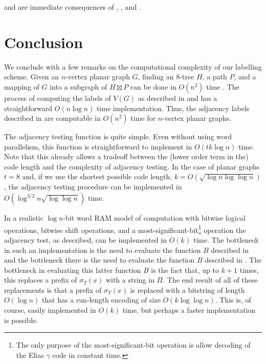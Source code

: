 \documentclass[kpfonts]{patmorin}
\begin{document}
 and  are immediate consequences of , , and .

\section{Conclusion}

We conclude with a few remarks on the computational complexity of our labelling scheme.  Given an $n$-vertex planar graph $G$, finding an 8-tree $H$, a path $P$, and a mapping of $G$ into a subgraph of $H\boxtimes P$ can be done in $O(n^2)$ time \cite{dujmovic.joret.ea:planar}.  The process of computing the labels of $V(G)$ as described in  and  has a straightforward $O(n\log n)$ time implementation.  Thus, the adjacency labels described in  are computable in $O(n^2)$ time for $n$-vertex planar graphs.

The adjacency testing function is quite simple. Even without using word parallelism, this function is straightforward to implement in $O(tk\log n)$ time.  Note that this already allows a tradeoff between the (lower order term in the) code length and the complexity of adjacency testing.
In the case of planar graphs $t=8$ and, if we use the shortest possible code length, $k=O(\sqrt{\log n\log\log n})$, the adjacency testing procedure can be implemented in $O(\log^{3/2} n\sqrt{\log\log n})$ time.

In a realistic $\log n$-bit word RAM model of computation with bitwise logical operations, bitwise shift operations, and a most-significant-bit\footnote{The only purpose of the most-significant-bit operation is allow decoding of the Elias $\gamma$ code in constant time.} operation the adjacency test, as described, can be implemented in $O(k)$ time.  The bottleneck in such an implementation is the need to evaluate the function $B$ described in  and the bottleneck there is the need to evaluate the function $B$ described in .  The bottleneck in evaluating this latter function $B$ is the fact that, up to $k+1$ times, this replaces a prefix of $\sigma_T(x)$ with a string in $\Pi$.  The end result of all of these replacements is that a prefix of $\sigma_T(x)$ is replaced with a bitstring of length $O(\log n)$ that has a run-length encoding of size $O(k\log\log n)$.  This is, of course, easily implemented in $O(k)$ time, but perhaps a faster implementation is possible.
\end{document}
